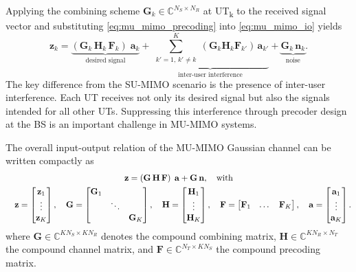 Applying the combining scheme $\mathbf{G}_k \in \mathbb{C}^{N_S \times N_R}$ at \ac{UT}\textsubscript{k} to the received signal vector and substituting \eqref{eq:mu_mimo_precoding} into \eqref{eq:mu_mimo_io} yields
\begin{equation}
\label{eq:mu_mimo_precoding_combining_io}
    \mathbf{z}_k 
    = \underbrace{\left(\mathbf{G}_k \, \mathbf{H}_k \, \mathbf{F}_k\right) \; \mathbf{a}_k}_{\text{desired signal}}
    + \underbrace{\sum_{\substack{k'=1, \, k'\neq k}}^{K} \left(\mathbf{G}_k \mathbf{H}_k \mathbf{F}_{k'}\right) \, \mathbf{a}_{k'}}_{\text{inter-user interference}} 
    + \underbrace{\mathbf{G}_k \, \mathbf{n}_k}_{\text{noise}}.
\end{equation}
The key difference from the \ac{SU}-\ac{MIMO} scenario is the presence of inter-user interference. Each \ac{UT} receives not only its desired signal but also the signals intended for all other \acp{UT}. Suppressing this interference through precoder design at the \ac{BS} is an important challenge in \ac{MU}-\ac{MIMO} systems.

The overall input-output relation of the \ac{MU}-\ac{MIMO} Gaussian channel can be written compactly as
\begin{gather}
\label{eq:mu_mimo_precoding_combining_io_compact}
    \mathbf{z} = \left(\mathbf{G} \, \mathbf{H} \, \mathbf{F}\right) \; \mathbf{a} + \mathbf{G} \, \mathbf{n}, \quad \text{with} \\
    \quad \mathbf{z} = \begin{bmatrix} \mathbf{z}_1 \\ \vdots \\ \mathbf{z}_K \end{bmatrix},
    \quad \mathbf{G} = \begin{bmatrix} \mathbf{G}_1 & & \\ & \ddots & \\ & & \mathbf{G}_K \end{bmatrix},
    \quad \mathbf{H} = \begin{bmatrix} \mathbf{H}_1 \\ \vdots \\ \mathbf{H}_K \end{bmatrix}, 
    \quad \mathbf{F} = \begin{bmatrix} \mathbf{F}_1 & \dots & \mathbf{F}_K \end{bmatrix}, 
    \quad \mathbf{a} = \begin{bmatrix} \mathbf{a}_1 \\ \vdots \\ \mathbf{a}_K \end{bmatrix}. \notag
\end{gather}
where $\mathbf{G} \in \mathbb{C}^{K N_S \times K N_R}$ denotes the compound combining matrix, $\mathbf{H} \in \mathbb{C}^{K N_R \times N_T}$ the compound channel matrix, and $\mathbf{F} \in \mathbb{C}^{N_T \times K N_S}$ the compound precoding matrix.


